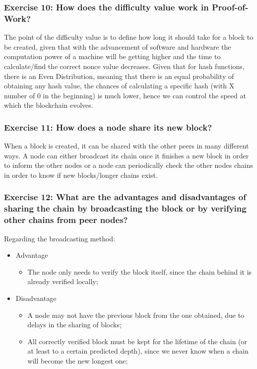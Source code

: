 \documentclass[12pt,a4paper]{article}
\begin{document}
\subsubsection*{Exercise 10: How does the difficulty value work in Proof-of-Work?}
The point of the difficulty value is to define how long it should take for a block to be created, given that with the advancement of software and hardware the computation power of a machine will be getting higher and the time to calculate/find the correct nonce value decreases. 
Given that for hash functions, there is an Even Distribution, meaning that there is an equal probability of obtaining any hash value, the chances of calculating a specific hash (with X number of 0 in the beginning) is much lower, hence we can control the speed at which the blockchain evolves.



\subsubsection*{Exercise 11: How does a node share its new block?}
When a block is created, it can be shared with the other peers in many different ways. A node can either broadcast its chain once it finishes a new block in order to inform the other nodes or a node can periodically check the other nodes chains in order to know if new blocks/longer chains exist.

\subsubsection*{Exercise 12: What are the advantages and disadvantages of sharing the chain by broadcasting the block or by verifying other chains from peer nodes?}
Regarding the broadcasting method: 
\begin{itemize}
    \item Advantage
    \begin{itemize}
        \item The node only needs to verify the block itself, since the chain behind it is already verified locally;
    \end{itemize}
    \item Disadvantage
    \begin{itemize}
        \item A node may not have the previous block from the one obtained, due to delays in the sharing of blocks;
        \item All correctly verified block must be kept for the lifetime of the chain (or at least to a certain predicted depth), since we never know when a chain will become the new longest one;
    \end{itemize}
\end{itemize}
\end{document}

